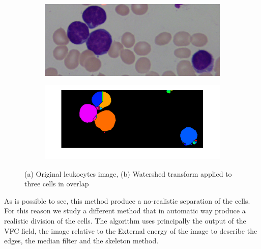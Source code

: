 \begin{figure}
	\centering
	\begin{subfigure}[b]{0.3\textwidth}
        \includegraphics[width=\textwidth]{img/Im007_1_crop.png}
        \caption{ }
        \label{fig:origimage}
    \end{subfigure}
    \begin{subfigure}[b]{0.3\textwidth}
		\includegraphics[width=\textwidth]{img/waterTrRes.png}
		\caption{ }
		\label{fig:watershedoncells}
	\end{subfigure}
	\caption{(a) Original leukocytes image, (b) Watershed transform applied to three cells in overlap}
	\label{fig:exOnImage7}
\end{figure}
As is possible to see, this method produce a no-realistic separation of the cells.
For this reason we study a different method that in automatic way produce a realistic division of the cells.
The algorithm uses principally the output of the VFC field, the image relative to the External energy of the image to describe the edges, the median filter and the skeleton method.
